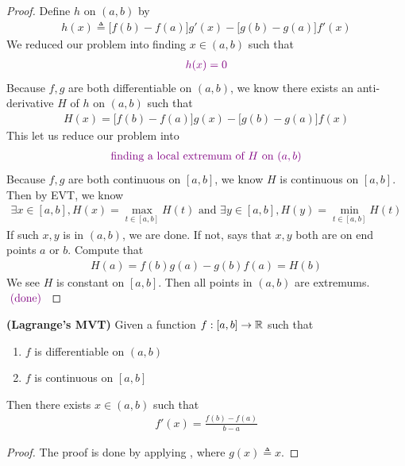 \documentclass{report}
\begin{document}
\begin{proof}
Define $h$ on  $(a,b)$ by 
\begin{align*}
h(x)\triangleq \big[f(b)-f(a)\big]g'(x)-\big[g(b)-g(a)\big]f'(x)
\end{align*}
We reduced our problem into finding $x \in (a,b)$ such that 
\begin{align*}
\textcolor{violet}{h(x)=0}
\end{align*}
Because $f,g$ are both differentiable on  $(a,b)$, we know there exists an anti-derivative $H$ of  $h$ on  $(a,b)$ such that
\begin{align*}
H(x)=\big[f(b) -f(a)\big]g(x)-\big[g(b)-g(a) \big]f(x)
\end{align*}
This let us reduce our problem into 
\begin{align*}
  \textcolor{violet}{\text{ finding a local extremum of $H$ on  $(a,b)$ }}
\end{align*}
Because $f,g$ are both continuous  on  $[a,b]$, we know $H$ is continuous on $[a,b]$. Then by EVT, we know 
 \begin{align*}
\exists x \in [a,b] , H(x)=\max_{t \in [a,b]}H(t)\text{ and }\exists y \in [a,b], H(y)=\min_{t \in [a,b]}H(t)
\end{align*}
If such $x,y$ is in $(a,b)$, we are done. If not, says that $x,y$ both are on end points $a$ or  $b$. Compute that 
\begin{align*}
H(a)=f(b)g(a)-g(b)f(a)=H(b)
\end{align*}
We see $H$ is constant on  $[a,b]$. Then all points in $(a,b)$ are extremums. $\textcolor{violet}{\text{ (done) }}$
\end{proof}
\begin{corollary}
\label{MVT}
\textbf{(Lagrange's MVT)} Given a function $f:[a,b]\rightarrow \mathbb{R}$ such that 
\begin{enumerate}[label=(\alph*)]
  \item $f$ is differentiable on  $(a,b)$ 
  \item $f$ is continuous on  $[a,b]$
\end{enumerate}
Then there exists $x \in (a,b)$ such that 
\begin{align*}
f'(x)=\frac{f(b)-f(a)}{b-a}
\end{align*}
\end{corollary}
\begin{proof}
The proof is done by applying , where $g(x)\triangleq x$.
\end{proof}
\end{document}

